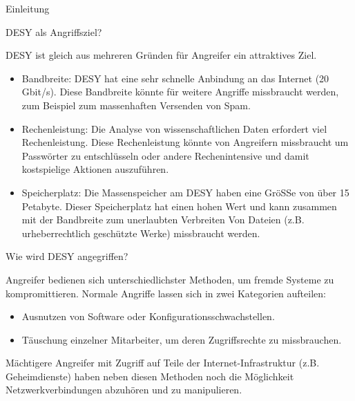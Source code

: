 \documentclass[final]{beamer}
\newlength{\twocolwid}
\begin{document}
\begin{frame}[t]
\begin{columns}[t]
\begin{column}{\twocolwid}
\begin{block}{Einleitung}
\end{block}


\begin{alertblock}{DESY als Angriffsziel?}
\small{
DESY ist gleich aus mehreren Gründen für Angreifer ein attraktives Ziel. 

\begin{itemize}
\item Bandbreite: DESY hat eine sehr schnelle Anbindung an das Internet 
(20 Gbit/s). Diese Bandbreite könnte für weitere Angriffe missbraucht 
werden, zum Beispiel zum massenhaften Versenden von Spam.

\item Rechenleistung: Die Analyse von wissenschaftlichen Daten erfordert 
viel Rechenleistung. Diese Rechenleistung könnte von Angreifern missbraucht 
um Passwörter zu entschlüsseln oder andere Rechenintensive und damit 
kostspielige Aktionen auszuführen.

\item  Speicherplatz: Die Massenspeicher am DESY haben eine GröSSe von über 
15 Petabyte. Dieser Speicherplatz hat einen hohen Wert und kann zusammen 
mit der Bandbreite zum unerlaubten Verbreiten Von Dateien (z.B. urheberrechtlich 
geschützte Werke) missbraucht werden.
\end{itemize}
}
\end{alertblock}


\begin{block}{Wie wird DESY angegriffen?}

Angreifer bedienen sich unterschiedlichster Methoden, um fremde Systeme zu 
kompromittieren. Normale Angriffe lassen sich in zwei Kategorien aufteilen:

\begin{itemize}
 \item Ausnutzen von Software oder Konfigurationsschwachstellen.
 \item Täuschung einzelner Mitarbeiter, um deren Zugriffsrechte zu missbrauchen.
\end{itemize}

Mächtigere Angreifer mit Zugriff auf Teile der Internet-Infrastruktur 
(z.B. Geheimdienste) haben neben diesen Methoden noch die Möglichkeit 
Netzwerkverbindungen abzuhören und zu manipulieren.


\end{block}
\end{column}
\end{columns}
\end{frame}
\end{document}
